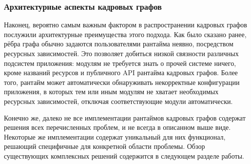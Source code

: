 \subsubsection{Архитектурные аспекты кадровых графов}
Наконец, вероятно самым важным фактором в распространении кадровых графов послужили архитектурные преимущества этого подхода.
Как было сказано ранее, рёбра графа обычно задаются пользователями рантайма неявно, посредством ресурсных зависимостей.
Это позволяет добиться низкой связности различных подсистем приложения: модулям не требуется знать о прочей системе ничего, кроме названий ресурсов и публичного API рантайма кадровых графов.
Более того, рантайм может автоматически обнаруживать некорректные конфигурации приложения, в которых тем или иным модулям не хватает необходимых ресурсных зависимостей, отключая соответствующие модули автоматически.

Конечно же, далеко не все имплементации рантаймов кадровых графов содержат решения всех перечисленных проблем, и не всегда в описанном выше виде.
Некоторые же имплементации содержат уникальный для них функционал, решающий специфичные для конкретной области проблемы.
Обзор существующих комплексных решений содержится в следующем разделе работы.
